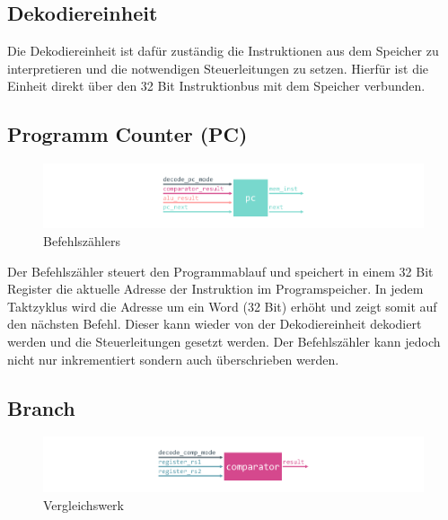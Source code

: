         \subsection{Dekodiereinheit}
            
            Die Dekodiereinheit ist dafür zuständig die Instruktionen aus dem Speicher zu interpretieren und die notwendigen
            Steuerleitungen zu setzen.
            Hierfür ist die Einheit direkt über den 32 Bit Instruktionbus mit dem Speicher verbunden.

        \subsection{Programm Counter (PC)}\label{lab:pc}

            \begin{figure}[H]
                \centering
                \includegraphics[scale=1]{img/block_pc.pdf}
                \caption{Befehlszählers}
                \label{fig:pc}
            \end{figure}

            Der Befehlszähler steuert den Programmablauf und speichert in einem 32 Bit Register
            die aktuelle Adresse der Instruktion im Programspeicher.
            In jedem Taktzyklus wird die Adresse um ein Word (32 Bit) erhöht und zeigt somit
            auf den nächsten Befehl. Dieser kann wieder von der Dekodiereinheit dekodiert werden
            und die Steuerleitungen gesetzt werden. Der Befehlszähler kann jedoch nicht nur
            inkrementiert sondern auch überschrieben werden.

            

        \subsection{Branch}

            \begin{figure}[H]
                \centering
                \includegraphics[scale=1]{img/block_comparator.pdf}
                \caption{Vergleichswerk}
                \label{fig:alu}
            \end{figure}

